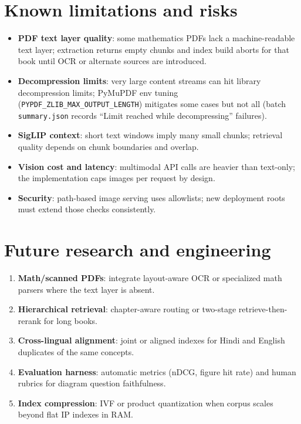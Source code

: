 \documentclass[11pt]{article}
\begin{document}
\section{Known limitations and risks}
\label{sec:limitations}

\begin{itemize}
  \item \textbf{PDF text layer quality}: some mathematics PDFs lack a machine-readable text layer; extraction returns empty chunks and index build aborts for that book until OCR or alternate sources are introduced.
  \item \textbf{Decompression limits}: very large content streams can hit library decompression limits; PyMuPDF env tuning (\texttt{PYPDF\_ZLIB\_MAX\_OUTPUT\_LENGTH}) mitigates some cases but not all (batch \texttt{summary.json} records ``Limit reached while decompressing'' failures).
  \item \textbf{SigLIP context}: short text windows imply many small chunks; retrieval quality depends on chunk boundaries and overlap.
  \item \textbf{Vision cost and latency}: multimodal API calls are heavier than text-only; the implementation caps images per request by design.
  \item \textbf{Security}: path-based image serving uses allowlists; new deployment roots must extend those checks consistently.
\end{itemize}

\section{Future research and engineering}
\label{sec:future}

\begin{enumerate}
  \item \textbf{Math/scanned PDFs}: integrate layout-aware OCR or specialized math parsers where the text layer is absent.
  \item \textbf{Hierarchical retrieval}: chapter-aware routing or two-stage retrieve-then-rerank for long books.
  \item \textbf{Cross-lingual alignment}: joint or aligned indexes for Hindi and English duplicates of the same concepts.
  \item \textbf{Evaluation harness}: automatic metrics (nDCG, figure hit rate) and human rubrics for diagram question faithfulness.
  \item \textbf{Index compression}: IVF or product quantization when corpus scales beyond flat IP indexes in RAM.
\end{enumerate}
\end{document}

